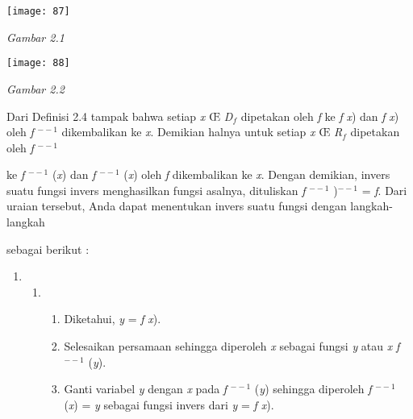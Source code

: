 \documentclass[11pt,fleqn]{book} %
\begin{document}
\begin{center}
\noindent \texttt{[image: 87]}
\end{center}

\noindent 

\noindent 

\noindent 

\noindent 

\noindent \textit{Gambar 2.1}

\noindent 

\noindent 

\noindent \textit{}

\begin{center}
\noindent \texttt{[image: 88]}
\end{center}

\noindent \textit{Gambar 2.2}

\noindent 

Dari Definisi 2.4 tampak bahwa setiap \textit{x} {\OE} \textit{D${}_{f}$} dipetakan oleh \textit{f} ke \textit{f} \textit{x}) dan \textit{f} \textit{x}) oleh \textit{f} ${}^{--1}$ dikembalikan ke \textit{x}. Demikian halnya untuk setiap \textit{x} {\OE} \textit{R${}_{f}$} dipetakan oleh \textit{f} ${}^{--1}$ 

\noindent ke \textit{f} ${}^{--1}$ (\textit{x}) dan \textit{f }${}^{--1}$\textit{ }(\textit{x})\textit{ }oleh\textit{ f }dikembalikan ke\textit{ x}. Dengan demikian,\textit{ }invers\textit{ }suatu fungsi invers menghasilkan fungsi asalnya, dituliskan \textit{f }${}^{--1}$\textit{ })${}^{--1}$\textit{ }=\textit{ f}. Dari uraian tersebut, Anda dapat menentukan\textit{ }invers\textit{ }suatu fungsi dengan langkah-langkah 

\noindent sebagai berikut :

\begin{enumerate}
\item \begin{enumerate}
\item \begin{enumerate}
\item  Diketahui, \textit{y} = \textit{f} \textit{x}).

\item  Selesaikan persamaan sehingga diperoleh \textit{x} sebagai fungsi \textit{y} atau \textit{x} \textit{f }${}^{--1}$\textit{ }(\textit{y}).

\item  Ganti variabel \textit{y} dengan \textit{x} pada \textit{f} ${}^{--1}$ (\textit{y}) sehingga diperoleh \textit{f }${}^{--1}$\textit{ }(\textit{x})\textit{ }=\textit{ y }sebagai\textit{ }fungsi invers dari\textit{ y }=\textit{ f x}).
\end{enumerate}
\end{enumerate}
\end{enumerate}
\end{document}
